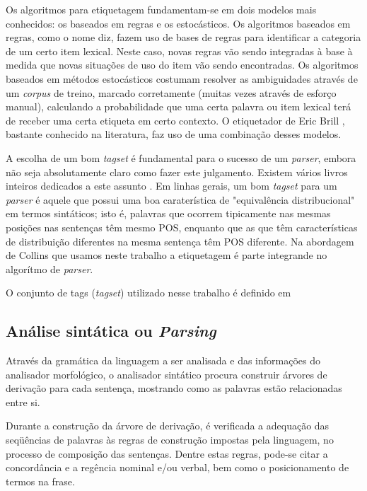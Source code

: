 Os algoritmos para etiquetagem fundamentam-se em dois modelos mais conhecidos: os baseados em regras e os estocásticos. Os algoritmos baseados em regras, como o nome diz, fazem uso de bases de regras para identificar a categoria de um certo item lexical. Neste caso, novas regras vão sendo integradas à base à medida que novas situações de uso do item vão sendo encontradas. Os algoritmos baseados em métodos estocásticos costumam resolver as ambiguidades através de um \emph{corpus} de treino, marcado corretamente (muitas vezes através de esforço manual), calculando a probabilidade que uma certa palavra ou item lexical terá de receber uma certa etiqueta em certo contexto. O etiquetador de Eric Brill \cite{brill95}, bastante conhecido na literatura, faz uso de uma combinação desses modelos.

A escolha de um bom \emph{tagset} é fundamental para o sucesso de um \emph{parser}, embora não seja absolutamente claro como fazer este julgamento. Existem vários livros inteiros dedicados a este assunto \cite{abeille03} \cite{sardinha04}. Em linhas gerais, um bom \emph{tagset} para um \emph{parser} é aquele que possui uma boa caraterística de "equivalência distribucional" em termos sintáticos; isto é, palavras que ocorrem tipicamente nas mesmas posições nas sentenças têm mesmo POS, enquanto que as que têm características de distribuição diferentes na mesma sentença têm POS diferente. Na abordagem de Collins \cite{collins99} que usamos neste trabalho a etiquetagem é parte integrande no algorítmo de \emph{parser}.

O conjunto de tags (\emph{tagset}) utilizado nesse trabalho é definido em \cite{florestasintatica}

\subsection{Análise sintática ou \emph{Parsing}} %
\label{sub:analise_sintatica_ou_parsing}

Através da gramática da linguagem a ser analisada e das informações do analisador morfológico, o analisador sintático procura construir árvores de derivação para cada sentença, mostrando como as palavras estão relacionadas entre si.

Durante a construção da árvore de derivação, é verificada a adequação das seqüências de palavras às regras de construção impostas pela linguagem, no processo de composição das sentenças. Dentre estas regras, pode-se citar a concordância e a regência nominal e/ou verbal, bem como o posicionamento de termos na frase.

